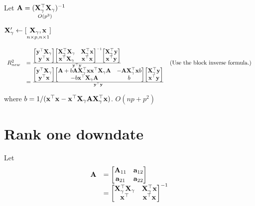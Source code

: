 \documentclass{amsart}
\begin{document}
Let ${\bf A} = (\underset{O(p^3)}{{\bf X}_\gamma^\top {\bf X}_\gamma})^{-1}$

${\bf X}_\gamma' \leftarrow [\underset{n \times p, n \times 1}{{\bf X}_\gamma, {\bf x}}]$

\begin{equation*}
\begin{array}{lll}
R^2_{new} &= \frac{
\begin{bmatrix}
{\bf y}^\top {\bf X}_\gamma \\
{\bf y}^\top {\bf x}
\end{bmatrix}
\begin{bmatrix}
{\bf X}_\gamma^\top {\bf X}_\gamma & {\bf X}_\gamma^\top {\bf x} \\
{\bf x}^\top {\bf X}_\gamma & {\bf x}^\top {\bf x}
\end{bmatrix}^{-1}
\begin{bmatrix}
{\bf X}_\gamma^\top {\bf y} \\
{\bf x}^\top {\bf y}
\end{bmatrix}
}{{\bf y}^\top {\bf y}} & \text{(Use the block inverse formula.)} \\
&= \frac{
\begin{bmatrix}
{\bf y}^\top {\bf X}_\gamma \\
{\bf y}^\top {\bf x}
\end{bmatrix}
\begin{bmatrix}
{\bf A} + b {\bf A} {\bf X}_\gamma^\top {\bf x} {\bf x}^\top {\bf X}_\gamma {\bf A} & -{\bf A} {\bf X}_\gamma^\top {\bf x} b \\
-b {\bf x}^\top {\bf X}_\gamma {\bf A} & b
\end{bmatrix}
\begin{bmatrix}
{\bf X}_\gamma^\top {\bf y} \\
{\bf x}^\top {\bf y}
\end{bmatrix}
}{{\bf y}^\top {\bf y}}
\end{array}
\end{equation*}

where $b = 1/({\bf x}^\top {\bf x} - {\bf x}^\top {\bf X}_\gamma {\bf A} {\bf X}_\gamma^\top {\bf x})$. $O(np + p^2)$

\section{Rank one downdate}

Let
\begin{equation*}
\begin{array}{ll}
{\bf A} &= \begin{bmatrix}
{\bf A}_{11} & {\bf a}_{12} \\
{\bf a}_{21} & {\bf a}_{22}
\end{bmatrix} \\
&= \begin{bmatrix}
{\bf X}_\gamma^\top {\bf X}_\gamma & {\bf X}_\gamma^\top {\bf x} \\
{\bf x}^\top & {\bf x}^\top {\bf x}
\end{bmatrix}^{-1}
\end{array}
\end{equation*}
\end{document}
